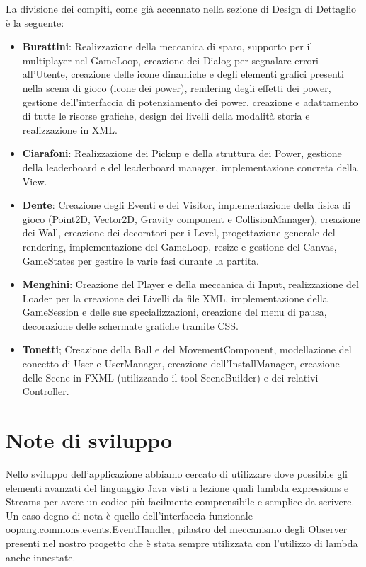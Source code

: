 \documentclass[a4paper,12pt]{report}
\begin{document}
La divisione dei compiti, come già accennato nella sezione di Design di Dettaglio è la seguente:
\begin{itemize}
	\item \textbf{Burattini}: Realizzazione della meccanica di sparo, supporto per il multiplayer nel GameLoop, creazione dei Dialog per segnalare errori all'Utente, creazione delle icone dinamiche e degli elementi grafici presenti nella scena di gioco (icone dei power), rendering degli effetti dei power, gestione dell'interfaccia di potenziamento dei power, creazione e adattamento di tutte le risorse grafiche, design dei livelli della modalità storia e realizzazione in XML.
	\item \textbf{Ciarafoni}: Realizzazione dei Pickup e della struttura dei Power, gestione della leaderboard e del leaderboard manager, implementazione concreta della View.
	\item \textbf{Dente}: Creazione degli Eventi e dei Visitor, implementazione della fisica di gioco (Point2D, Vector2D, Gravity component e CollisionManager), creazione dei Wall, creazione dei decoratori per i Level, progettazione generale del rendering, implementazione del GameLoop, resize e gestione del Canvas, GameStates per gestire le varie fasi durante la partita.
	\item \textbf{Menghini}: Creazione del Player e della meccanica di Input, realizzazione del Loader per la creazione dei Livelli da file XML, implementazione della GameSession e delle sue specializzazioni, creazione del menu di pausa, decorazione delle schermate grafiche tramite CSS.
	\item \textbf{Tonetti}; Creazione della Ball e del MovementComponent, modellazione del concetto di User e UserManager, creazione dell'InstallManager, creazione delle Scene in FXML (utilizzando il tool SceneBuilder) e dei relativi Controller.
\end{itemize}




\section{Note di sviluppo}
Nello sviluppo dell'applicazione abbiamo cercato di utilizzare dove possibile gli elementi avanzati del linguaggio Java visti a lezione quali lambda expressions e Streams per avere un codice più facilmente comprensibile e semplice da scrivere.
Un caso degno di nota è quello dell'interfaccia funzionale oopang.commons.events.EventHandler, pilastro del meccanismo degli Observer presenti nel nostro progetto che è stata sempre utilizzata con l'utilizzo di lambda anche innestate.
\end{document}
